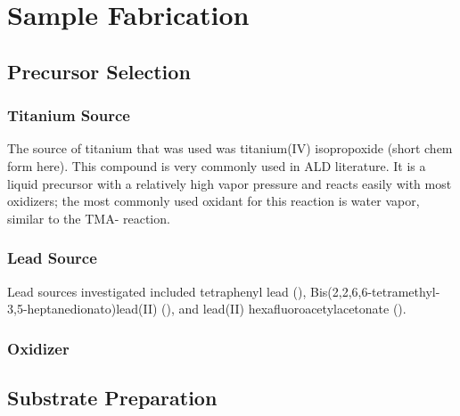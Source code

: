 \chapter{Sample Fabrication}
\label{ch:SampFab}
\thispagestyle{empty}



\section{Precursor Selection}
\label{sec:SampFab-Precursor}

\lipsum

\subsection{Titanium Source}

The source of titanium that was used was titanium(IV) isopropoxide (short chem form here). This compound is very commonly used in ALD literature. It is a liquid precursor with a relatively high vapor pressure and reacts easily with most oxidizers; the most commonly used oxidant for this reaction is water vapor, similar to the TMA- reaction.  

\subsection{Lead Source}

Lead sources investigated included tetraphenyl lead (), Bis(2,2,6,6-tetramethyl-3,5-heptanedionato)lead(II) (), and lead(II) hexafluoroacetylacetonate (). 

\subsection{Oxidizer}

\lipsum


\section{Substrate Preparation}
\label{sec:SampFab-Substrates}

